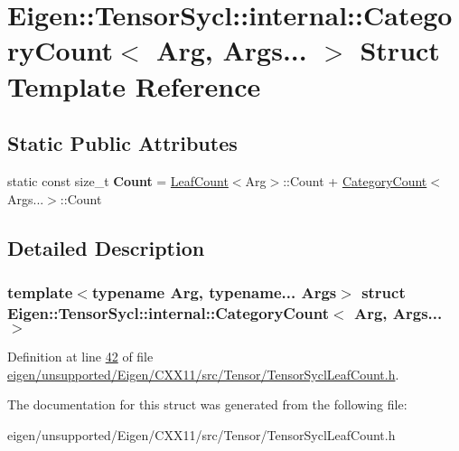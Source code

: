 \hypertarget{struct_eigen_1_1_tensor_sycl_1_1internal_1_1_category_count_3_01_arg_00_01_args_8_8_8_01_4}{}\section{Eigen\+:\+:Tensor\+Sycl\+:\+:internal\+:\+:Category\+Count$<$ Arg, Args... $>$ Struct Template Reference}
\label{struct_eigen_1_1_tensor_sycl_1_1internal_1_1_category_count_3_01_arg_00_01_args_8_8_8_01_4}
\subsection*{Static Public Attributes}
\begin{DoxyCompactItemize}
\item 
\mbox{\label{struct_eigen_1_1_tensor_sycl_1_1internal_1_1_category_count_3_01_arg_00_01_args_8_8_8_01_4_a67efe518da078afeda7311259719e145}} 
static const size\+\_\+t {\bfseries Count} = \hyperlink{struct_eigen_1_1_tensor_sycl_1_1internal_1_1_leaf_count}{Leaf\+Count}$<$Arg$>$\+::Count + \hyperlink{struct_eigen_1_1_tensor_sycl_1_1internal_1_1_category_count}{Category\+Count}$<$Args...$>$\+::Count
\end{DoxyCompactItemize}


\subsection{Detailed Description}
\subsubsection*{template$<$typename Arg, typename... Args$>$\newline
struct Eigen\+::\+Tensor\+Sycl\+::internal\+::\+Category\+Count$<$ Arg, Args... $>$}



Definition at line \hyperlink{eigen_2unsupported_2_eigen_2_c_x_x11_2src_2_tensor_2_tensor_sycl_leaf_count_8h_source_l00042}{42} of file \hyperlink{eigen_2unsupported_2_eigen_2_c_x_x11_2src_2_tensor_2_tensor_sycl_leaf_count_8h_source}{eigen/unsupported/\+Eigen/\+C\+X\+X11/src/\+Tensor/\+Tensor\+Sycl\+Leaf\+Count.\+h}.



The documentation for this struct was generated from the following file\+:\begin{DoxyCompactItemize}
\item 
eigen/unsupported/\+Eigen/\+C\+X\+X11/src/\+Tensor/\+Tensor\+Sycl\+Leaf\+Count.\+h\end{DoxyCompactItemize}
